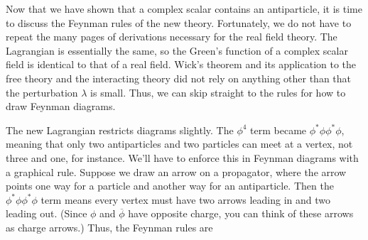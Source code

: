 Now that we have shown that a complex scalar contains an antiparticle, it is time to discuss the Feynman rules of the new theory. Fortunately, we do not have to repeat the many pages of derivations necessary for the real field theory. The Lagrangian is essentially the same, so the Green's function of a complex scalar field is identical to that of a real field. Wick's theorem and its application to the free theory and the interacting theory did not rely on anything other than that the perturbation $\lambda$ is small. Thus, we can skip straight to the rules for how to draw Feynman diagrams.

The new Lagrangian restricts diagrams slightly. The $\phi^4$ term became $\phi^*\phi \phi^*\phi$, meaning that only two antiparticles and two particles can meet at a vertex, not three and one, for instance. We'll have to enforce this in Feynman diagrams with a graphical rule. Suppose we draw an arrow on a propagator, where the arrow points one way for a particle and another way for an antiparticle. Then the $\phi^*\phi \phi^*\phi$ term means every vertex must have two arrows leading in and two leading out. (Since $\phi$ and $\overline \phi$ have opposite charge, you can think of these arrows as charge arrows.) Thus, the Feynman rules are 

